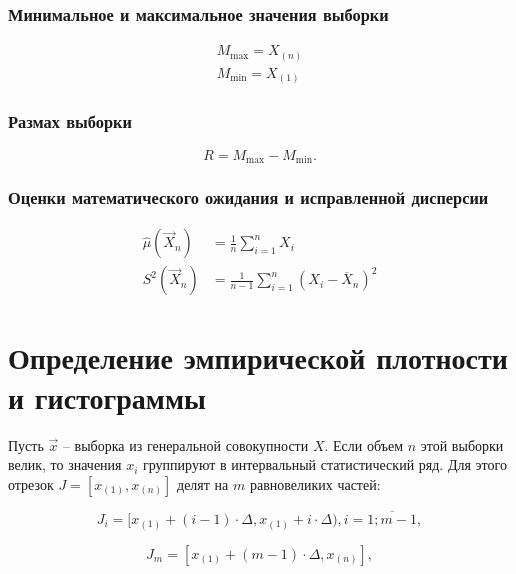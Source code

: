 \documentclass[12pt]{report}
\begin{document}
\subsubsection{Минимальное и максимальное значения выборки}
\begin{equation}
    \begin{aligned}
        M_{\max} = X_{(n)}\\
        M_{\min} = X_{(1)}
    \end{aligned}
\end{equation}

\subsubsection{Размах выборки}
\begin{equation}
    R = M_{\max} - M_{\min}.
\end{equation}

\subsubsection{Оценки математического ожидания и исправленной дисперсии}
\begin{equation}
    \begin{aligned}
    \hat\mu(\vec X_n) &= \frac 1n \sum_{i=1}^n X_i\\
    S^2(\vec X_n) &= \frac 1{n-1} \sum_{i=1}^n (X_i-\overline X_n)^2
    \end{aligned}
\end{equation}

\section{Определение эмпирической плотности и гистограммы}

Пусть $\vec x$ -- выборка из генеральной совокупности $X$. Если объем $n$ этой выборки велик, то значения $x_i$ группируют в интервальный статистический ряд. Для этого отрезок $J = [x_{(1)}, x_{(n)}]$ делят на $m$ равновеликих частей:

\begin{equation*}
    J_i = [x_{(1)} + (i - 1) \cdot \Delta, x_{(1)} + i \cdot \Delta), i = \overline{1; m - 1},
\end{equation*}

\begin{equation*}
    J_{m} = [x_{(1)} + (m - 1) \cdot \Delta, x_{(n)}],
\end{equation*}
\end{document}
